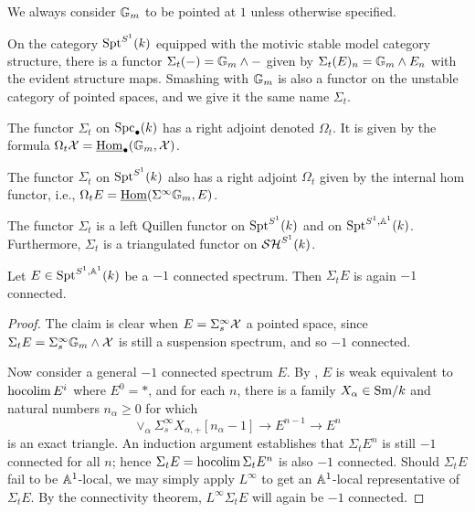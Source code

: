 \documentclass{amsart}%
\begin{document}
We always consider $\mathbb{G}_m$ to be pointed at $1$ unless otherwise
specified.

\begin{definition}
  On the category $\mathrm{Spt}^{S^1}(k)$ equipped with the motivic stable model
  category structure, there is a functor
  $\Sigma_t(-) = \mathbb{G}_m \wedge -$ given by
  $\Sigma_t(E)_n = \mathbb{G}_m \wedge E_n$ with the evident structure maps.
  Smashing with $\mathbb{G}_m$ is also a functor on the unstable category of
  pointed spaces, and we give it the same name $\Sigma_t$.
\end{definition}

\begin{definition}
  The functor $\Sigma_t$ on $\mathrm{Spc}_{\bullet}(k)$ has a right adjoint
  denoted $\Omega_t$. It is given by the formula
  $\Omega_t\mathcal{X} = \underline{\operatorname{Hom}}_{\bullet}(\mathbb{G}_m,\mathcal{X})$.

  The functor $\Sigma_t$ on $\mathrm{Spt}^{S^1}(k)$ also has a right adjoint
  $\Omega_t$ given by the internal hom functor, i.e.,
  $\Omega_tE = \underline{\operatorname{Hom}}(\Sigma^{\infty}\mathbb{G}_{m}, E)$.
\end{definition}

\begin{proposition}
  The functor $\Sigma_t$ is a left Quillen functor on $\mathrm{Spt}^{S^1}(k)$
  and on $\mathrm{Spt}^{S^1,\mathbb{A}^1}(k)$. Furthermore, $\Sigma_t$ is a
  triangulated functor on $\mathcal{SH}^{S^1}(k)$.
\end{proposition}

\begin{lemma}
  Let $E \in \mathrm{Spt}^{S^1,\mathbb{A}^1}(k)$ be a $-1$ connected spectrum. Then
  $\Sigma_t E$ is again $-1$ connected.
\end{lemma}

\begin{proof}
  The claim is clear when $E = \Sigma^{\infty}_s \mathcal{X}$ a pointed
  space, since $\Sigma_t E = \Sigma^{\infty}_s \mathbb{G}_m \wedge \mathcal{X}$ is
  still a suspension spectrum, and so $-1$ connected.

  Now consider a general $-1$ connected spectrum $E$. By \cite[Lemma
  3.3.4]{Mor05}, $E$ is weak equivalent to $ \operatorname{hocolim} E^i$ where
  $E^0 = *$, and for each $n$, there is a family
  $X_{\alpha} \in \mathrm{Sm}/k$ and natural numbers $n_{\alpha}\geq 0$ for
  which
  \begin{equation*}
    \vee_{\alpha}\Sigma^{\infty}_s X_{\alpha,+}[n_{\alpha}-1] \to E^{n-1} \to E^{n}
  \end{equation*}
  is an exact triangle. An induction argument establishes that
  $\Sigma_t E^{n}$ is still $-1$ connected for all $n$; hence
  $\Sigma_t E =\operatorname{hocolim} \Sigma_t E^n$ is also $-1$ connected. Should
  $\Sigma_t E$ fail to be $\mathbb{A}^1$-local, we may simply apply
  $L^{\infty}$ to get an $\mathbb{A}^1$-local representative of
  $\Sigma_t E$. By the connectivity theorem, $L^{\infty}\Sigma_t E$
  will again be $-1$ connected. 
\end{proof}
\end{document}
